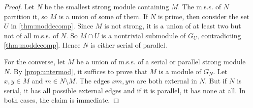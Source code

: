 \documentclass{amsart}
\makeatletter
\theoremstyle{plain}
{
	\newtheorem{{lemma}}{{Lemma}}[section]
	\labelformat{{lemma}}{{Lemma}##}
}
{
	\newtheorem{{theorem}}{{Theorem}}[section]
	\labelformat{{theorem}}{{Theorem}##}
}
{	\@namedef{c@{theorem}}{\@nameuse{c@{lemma}}}}
{
	\newtheorem{{corollary}}{{Corollary}}[section]
	\labelformat{{corollary}}{{Corollary}##}
}
{	\@namedef{c@{corollary}}{\@nameuse{c@{lemma}}}}
{
	\newtheorem{{proposition}}{{Proposition}}[section]
	\labelformat{{proposition}}{{Proposition}##}
}
{	\@namedef{c@{proposition}}{\@nameuse{c@{lemma}}}}
{
	\newtheorem{{algorithm}}{{Construction}}[section]
	\labelformat{{algorithm}}{{Construction}##}
}
{	\@namedef{c@{algorithm}}{\@nameuse{c@{lemma}}}}
\theoremstyle{definition}
{
	\newtheorem{{definition}}{{Definition}}[section]
	\labelformat{{definition}}{{Definition}##}
}
{	\@namedef{c@{definition}}{\@nameuse{c@{lemma}}}}
{
	\newtheorem{{problem}}{{Problem}}[section]
	\labelformat{{problem}}{{Problem}##}
}
{	\@namedef{c@{problem}}{\@nameuse{c@{lemma}}}}
\makeatother
\begin{document}
\begin{proof}
	Let $N$ be the smallest strong module containing $M$. The m.s.s. of $N$ partition it, so $M$ is a union of some of them. 
	If $N$ is prime, then consider the set $U$ in \ref{thm:moddecomp}. Since $M$ is not strong, it is a union of at least two but not of all m.s.s. of $N$. So $M \cap U$ is a nontrivial submodule of $G_U$, contradicting \ref{thm:moddecomp}.
	Hence $N$ is either serial of parallel.
	
	For the converse, let $M$ be a union of m.s.s. of a serial or parallel strong module $N$. By \ref{prop:untermod}, it suffices to prove that $M$ is a module of $G_{N}$. Let $x,y \in M$ and $m \in N \setminus M$. The edges $xm, ym$ are both external in $N$. But if $N$ is serial, it has all possible external edges and if it is parallel, it has none at all. In both cases, the claim is immediate.
\end{proof}
\end{document}

